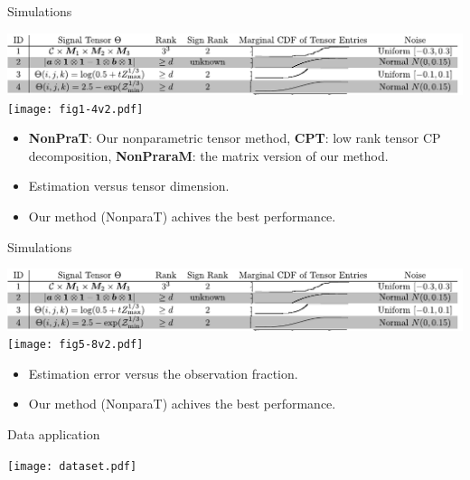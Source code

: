 \documentclass[10pt, mathserif]{beamer} %
\theoremstyle{definition}
\theoremstyle{plain}
\begin{document}
\begin{frame}{Simulations}
    \begin{center}
    \includegraphics[width = \textwidth]{simulation.pdf}
    \texttt{[image: fig1-4v2.pdf]}
    \end{center}
    \begin{itemize}
    \item {\bf NonPraT}: Our nonparametric tensor method, {\bf CPT}: low rank tensor CP decomposition, {\bf NonPraraM}: the matrix version of our method.
    \item Estimation versus tensor dimension.
    \item Our method (NonparaT) achives the best performance.
    \end{itemize}
\end{frame}

\begin{frame}{Simulations}
    \begin{center}
    \includegraphics[width = \textwidth]{simulation.pdf}
    \texttt{[image: fig5-8v2.pdf]}
    \end{center}
    \begin{itemize}
        \item Estimation error versus the observation fraction.
        \item Our method (NonparaT) achives the best performance.
    \end{itemize}
\end{frame}

\begin{frame}{Data application}
    \begin{center}
    \texttt{[image: dataset.pdf]}
    \end{center}
\end{frame}
\end{document}
